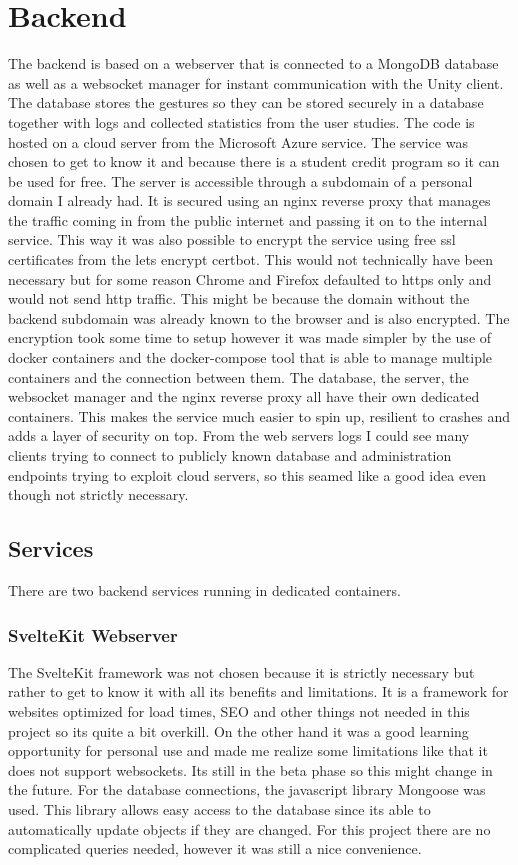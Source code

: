 
\chapter{Backend}
The backend is based on a webserver that is connected to a MongoDB database as well as a websocket manager for instant communication with the Unity client. The database stores the gestures so they can be stored securely in a database together with logs and collected statistics from the user studies. The code is hosted on a cloud server from the Microsoft Azure service. The service was chosen to get to know it and because there is a student credit program so it can be used for free. The server is accessible through a subdomain of a personal domain I already had. It is secured using an nginx reverse proxy that manages the traffic coming in from the public internet and passing it on to the internal service. This way it was also possible to encrypt the service using free ssl certificates from the lets encrypt certbot. This would not technically have been necessary but for some reason Chrome and Firefox defaulted to https only and would not send http traffic. This might be because the domain without the backend subdomain was already known to the browser and is also encrypted. The encryption took some time to setup however it was made simpler by the use of docker containers and the docker-compose tool that is able to manage multiple containers and the connection between them. The database, the server, the websocket manager and the nginx reverse proxy all have their own dedicated containers. This makes the service much easier to spin up, resilient to crashes and adds a layer of security on top. From the web servers logs I could see many clients trying to connect to publicly known database and administration endpoints trying to exploit cloud servers, so this seamed like a good idea even though not strictly necessary. 

\section{Services}
There are two backend services running in dedicated containers.

\subsection{SvelteKit Webserver}
The SvelteKit framework was not chosen because it is strictly necessary but rather to get to know it with all its benefits and limitations. It is a framework for websites optimized for load times, SEO and other things not needed in this project so its quite a bit overkill. On the other hand it was a good learning opportunity for personal use and made me realize some limitations like that it does not support websockets. Its still in the beta phase so this might change in the future. For the database connections, the javascript library Mongoose was used. This library allows easy access to the database since its able to automatically update objects if they are changed. For this project there are no complicated queries needed, however it was still a nice convenience. 

